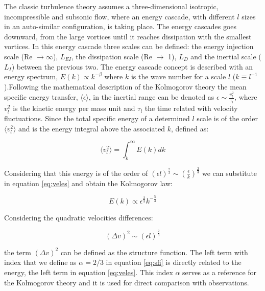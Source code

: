 The classic turbulence theory \citep{kolm1} assumes a three-dimensional isotropic, incompressible and subsonic flow, where an energy cascade, with different $l$ sizes in an auto-similar configuration, is taking place. 
The energy cascades goes downward, from the large vortices until it reaches dissipation with the smallest vortices.
In this energy cascade three scales can be defined: the energy injection scale (Re $\rightarrow \infty$), $L_{EI}$, the dissipation scale (Re $\rightarrow$ 1), $L_{D}$ and the inertial scale ($L_{I}$) between the previous two. The energy cascade concept is described with an energy spectrum, $E(k) \propto k^{-\beta}$ where $k$ is the wave number for a scale $l$ ($k \equiv l^{-1}$).Following the mathematical description of the Kolmogorov theory the mean specific energy transfer, $\langle \epsilon \rangle$, in the inertial range can be denoted as $\epsilon \sim \frac{v_{l}^{2}}{\tau_{l}}$, where $v_{l}^{2}$ is the kinetic energy per mass unit and $\tau_{l}$ the time related with velocity fluctuations. Since the total specific energy of a determined $l$ scale is of the order $\langle v_{l}^{2} \rangle$ and is the energy integral above the associated $k$, defined as:

\begin{equation}\label{eq:veles}
 \langle v_{l}^{2} \rangle = \int_{k}^{\infty} E(k)dk
\end{equation}

Considering that this energy is of the order of $(\epsilon l)^{\frac{2}{3}} \sim (\frac{\epsilon}{k})^{\frac{2}{3}}$ we can substitute in equation \ref{eq:veles} and obtain the Kolmogorov law:

\begin{equation}\label{eq:kolm}
E(k) \propto \epsilon^\frac{2}{3} k^{-\frac{5}{3}}
\end{equation}

Considering the quadratic velocities differences:

\begin{equation}\label{eq:sfi}
(\Delta v)^{2} \sim (\epsilon l)^{\frac{2}{3}}
\end{equation}

the term $(\Delta v)^{2}$ can be defined as the structure function. The left term with index that we define as $\alpha= 2/3$ in equation \ref{eq:sfi} is directly related to the energy, the left term in equation \ref{eq:veles}. This index $\alpha$ serves as a reference for the Kolmogorov theory and it is used for direct comparison with observations.

